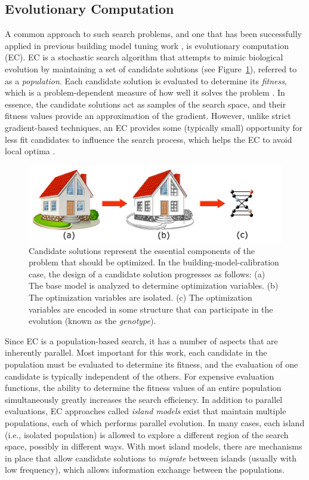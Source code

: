 \documentclass[preprint, review, 12pt]{elsarticle}
\begin{document}
\subsection{Evolutionary Computation}
A common approach to such search problems, and one that has been successfully applied in previous building model tuning work \cite{cit:garrett2013}, is evolutionary computation (EC). EC \cite{cit:dejong1993,cit:spears1993,cit:fogel1994,cit:fogel2000} is a stochastic search algorithm that attempts to mimic biological evolution by maintaining a set of candidate solutions (see Figure~\ref{fig:chromosome}), referred to as a \emph{population}. Each candidate solution is evaluated to determine its \emph{fitness}, which is a problem-dependent measure of how well it solves the problem \cite{cit:dejong2006}. In essence, the candidate solutions act as samples of the search space, and their fitness values provide an approximation of the gradient. However, unlike strict gradient-based techniques, an EC provides some (typically small) opportunity for less fit candidates to influence the search process, which helps the EC to avoid local optima \cite{cit:michalewicz2004}. 

\begin{figure}[htbp]
\centering
\includegraphics[width=5in]{graphics/autotune_chromosome}
\caption{Candidate solutions represent the essential components of the problem that should be optimized. In the building-model-calibration case, the design of a candidate solution progresses as follows: 
(a) The base model is analyzed to determine optimization variables.
(b) The optimization variables are isolated.
(c) The optimization variables are encoded in some structure that can participate in the evolution (known as the \emph{genotype}).}
\label{fig:chromosome}
\end{figure}

Since EC is a population-based search, it has a number of aspects that are inherently parallel. Most important for this work, each candidate in the population must be evaluated to determine its fitness, and the evaluation of one candidate is typically independent of the others. For expensive evaluation functions, the ability to determine the fitness values of an entire population simultaneously greatly increases the search efficiency. In addition to parallel evaluations, EC approaches called \emph{island models} \cite{cit:eiben2007} exist that maintain multiple populations, each of which performs parallel evolution. In many cases, each island (i.e., isolated population) is allowed to explore a different region of the search space, possibly in different ways. With most island models, there are mechanisms in place that allow candidate solutions to \emph{migrate} between islands (usually with low frequency), which allows information exchange between the populations.
\end{document}
